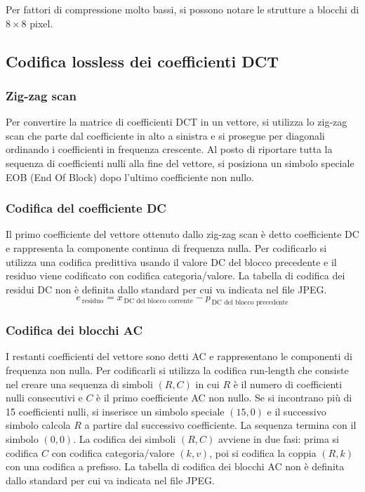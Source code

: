 Per fattori di compressione molto bassi, si possono notare le strutture a blocchi di \(8 \times 8\) pixel.

\subsection{Codifica lossless dei coefficienti DCT}
\subsubsection*{Zig-zag scan}
Per convertire la matrice di coefficienti DCT in un vettore, si utilizza lo zig-zag scan che parte dal coefficiente
in alto a sinistra e si prosegue per diagonali ordinando i coefficienti in frequenza crescente. Al posto di riportare
tutta la sequenza di coefficienti nulli alla fine del vettore, si posiziona un simbolo speciale EOB (End Of Block) dopo
l'ultimo coefficiente non nullo.

\subsubsection*{Codifica del coefficiente DC}
Il primo coefficiente del vettore ottenuto dallo zig-zag scan è detto coefficiente DC e rappresenta la componente continua
di frequenza nulla. Per codificarlo si utilizza una codifica predittiva usando il valore DC del blocco precedente e
il residuo viene codificato con codifica categoria/valore. La tabella di codifica dei residui DC non è definita dallo
standard per cui va indicata nel file JPEG.
\[e_{\, \text{residuo}} = x_{\, \text{DC del blocco corrente}} - p_{\, \text{DC del blocco precedente}}\]

\subsubsection*{Codifica dei blocchi AC}
I restanti coefficienti del vettore sono detti AC e rappresentano le componenti di frequenza non nulla. Per codificarli
si utilizza la codifica run-length che consiste nel creare una sequenza di simboli \((R,C)\) in cui \(R\) è il numero di
coefficienti nulli consecutivi e \(C\) è il primo coefficiente AC non nullo. Se si incontrano più di 15 coefficienti
nulli, si inserisce un simbolo speciale \((15,0)\) e il successivo simbolo calcola \(R\) a partire dal successivo
coefficiente. La sequenza termina con il simbolo \((0,0)\). La codifica dei simboli \((R,C)\) avviene in due fasi:
prima si codifica \(C\) con codifica categoria/valore \((k, v)\), poi si codifica la coppia \((R,k)\) con una codifica
a prefisso. La tabella di codifica dei blocchi AC non è definita dallo standard per cui va indicata nel file JPEG.

